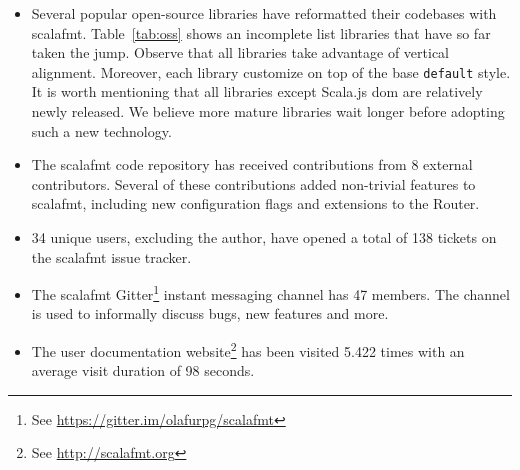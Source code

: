 \begin{itemize}
  \item Several popular open-source libraries have reformatted their codebases with scalafmt.
    Table~\ref{tab:oss} shows an incomplete list libraries that have so far taken the jump.
    Observe that all libraries take advantage of vertical alignment.
    Moreover, each library customize on top of the base \texttt{default} style.
    It is worth mentioning that all libraries except Scala.js dom are relatively newly released.
    We believe more mature libraries wait longer before adopting such a new technology.
  \item The scalafmt code repository has received contributions from 8 external contributors.
    Several of these contributions added non-trivial features to scalafmt, including
    new configuration flags and extensions to the Router.
  \item 34 unique users, excluding the author, have opened a total of 138 tickets on the scalafmt issue tracker.
  \item The scalafmt Gitter\footnote{See \url{https://gitter.im/olafurpg/scalafmt}} instant messaging channel has 47 members. The channel is used to informally discuss bugs, new features and more.
  \item The user documentation website\footnote{See \url{http://scalafmt.org}} has been visited 5.422 times with an average visit duration of 98 seconds.
\end{itemize}



